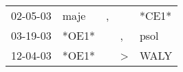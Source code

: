 \begin{supertabular}{lllll}
 02-05-03 &   maje &  , &               &  *CE1* \\
 03-19-03 &  *OE1* &    &             , &   psol \\
 12-04-03 &  *OE1* &    &  \textgreater &   WALY \\
\end{supertabular}
